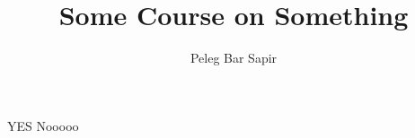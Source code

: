 \documentclass{article}
\title{Some Course on Something}
\author{Peleg Bar Sapir}
\begin{document}
\maketitle

\ifdefined\testcode
  YES
\else
  Nooooo
\fi




\end{document}
